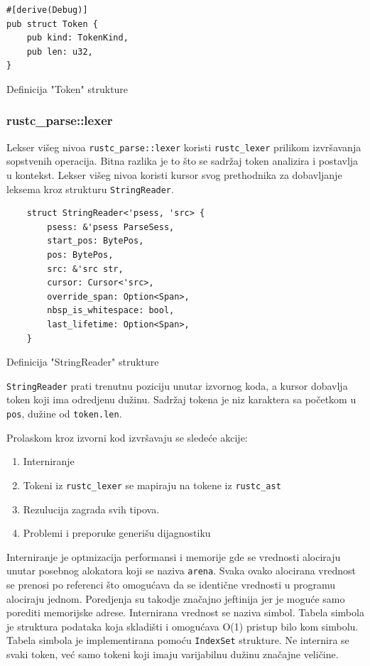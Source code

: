 \documentclass[11pt]{article}
\begin{document}
\begin{listing}[H]
\begin{verbatim}
#[derive(Debug)]
pub struct Token {
    pub kind: TokenKind,
    pub len: u32,
}   
\end{verbatim}
\caption{Definicija "Token" strukture}
\end{listing}

\newpage
\subsubsection{rustc\_parse::lexer}

Lekser višeg nivoa \verb|rustc_parse::lexer| koristi \verb|rustc_lexer| prilikom izvršavanja sopstvenih
operacija. Bitna razlika je to što se sadržaj token analizira i postavlja u kontekst.
Lekser višeg nivoa koristi kursor svog prethodnika za dobavljanje leksema kroz strukturu \verb|StringReader|. 

\begin{listing}[H]
\begin{verbatim}
    struct StringReader<'psess, 'src> {
        psess: &'psess ParseSess,
        start_pos: BytePos,
        pos: BytePos,
        src: &'src str,
        cursor: Cursor<'src>,
        override_span: Option<Span>,
        nbsp_is_whitespace: bool,
        last_lifetime: Option<Span>,
    }
\end{verbatim}
\caption{Definicija "StringReader" strukture}
\end{listing}
\verb|StringReader| prati trenutnu poziciju unutar izvornog koda, a kursor 
dobavlja token koji ima odredjenu dužinu. Sadržaj tokena je niz karaktera sa početkom u \verb|pos|,
dužine od \verb|token.len|. 

Prolaskom kroz izvorni kod izvršavaju se sledeće akcije:
\begin{enumerate}
    \item Interniranje 
    \item Tokeni iz \verb|rustc_lexer| se mapiraju na tokene iz \verb|rustc_ast|
    \item Rezulucija zagrada svih tipova.
    \item Problemi i preporuke generišu dijagnostiku 
\end{enumerate}

Interniranje je optmizacija performansi i memorije gde se vrednosti alociraju unutar 
posebnog alokatora koji se naziva \verb|arena|. Svaka ovako alocirana vrednost se prenosi po 
referenci što omogućava da se identične vrednosti u programu alociraju jednom. Poredjenja
su takodje značajno jeftinija jer je moguće samo porediti memorijske adrese. 
Internirana vrednost se naziva simbol. Tabela simbola je struktura podataka
koja skladišti i omogućava O(1) pristup bilo kom simbolu.  Tabela simbola je implementirana pomoću \verb|IndexSet|
strukture. Ne internira se svaki token, već samo tokeni koji imaju varijabilnu dužinu značajne veličine.
\end{document}
